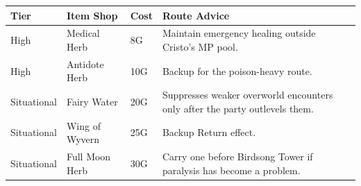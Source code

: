 \documentclass[
  american,
  10pt,
  letterpaper,
  oneside,
  open=any]{scrreprt}
\newcounter{none} %
\newenvironment{guidetable}{%
  \small\setstretch{1.0}%
  \setlength{\tabcolsep}{4pt}%
  \setlength{\LTpre}{8pt}\setlength{\LTpost}{10pt}%
  \renewcommand{\arraystretch}{1.16}%
}{ }
\begin{document}
\begin{guidetable}

{\def\LTcaptype{none} %
\begin{longtable}[]{@{}
  >{\raggedright\arraybackslash}p{}
  >{\raggedright\arraybackslash}p{}
  >{\raggedleft\arraybackslash}p{}
  >{\raggedright\arraybackslash}p{}@{}}
\toprule\noalign{}
\begin{minipage}[b]{\linewidth}\raggedright
\color{GuideGreen}\bfseries Tier
\end{minipage} & \begin{minipage}[b]{\linewidth}\raggedright
\color{GuideGreen}\bfseries Item Shop
\end{minipage} & \begin{minipage}[b]{\linewidth}\raggedleft
\color{GuideGreen}\bfseries Cost
\end{minipage} & \begin{minipage}[b]{\linewidth}\raggedright
\color{GuideGreen}\bfseries Route Advice
\end{minipage} \\
\midrule\noalign{}
\endhead
\bottomrule\noalign{}
\endlastfoot
High & Medical Herb & 8G & Maintain emergency healing outside Cristo's
MP pool. \\
High & Antidote Herb & 10G & Backup for the poison-heavy route. \\
Situational & Fairy Water & 20G & Suppresses weaker overworld encounters
only after the party outlevels them. \\
Situational & Wing of Wyvern & 25G & Backup Return effect. \\
Situational & Full Moon Herb & 30G & Carry one before Birdsong Tower if
paralysis has become a problem. \\
\end{longtable}
}

\end{guidetable}
\end{document}
